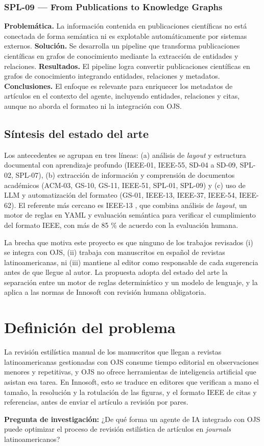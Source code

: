 \subsubsection*{SPL-09 --- From Publications to Knowledge Graphs \cite{ref26}}

\textbf{Problemática.} La información contenida en publicaciones científicas no está conectada de forma semántica ni es explotable automáticamente por sistemas externos. \textbf{Solución.} Se desarrolla un pipeline que transforma publicaciones científicas en grafos de conocimiento mediante la extracción de entidades y relaciones. \textbf{Resultados.} El pipeline logra convertir publicaciones científicas en grafos de conocimiento integrando entidades, relaciones y metadatos. \textbf{Conclusiones.} El enfoque es relevante para enriquecer los metadatos de artículos en el contexto del agente, incluyendo entidades, relaciones y citas, aunque no aborda el formateo ni la integración con OJS.

\subsection{Síntesis del estado del arte}

Los antecedentes se agrupan en tres líneas: (a) análisis de \emph{layout} y estructura documental con aprendizaje profundo (IEEE-01, IEEE-55, SD-04 a SD-09, SPL-02, SPL-07), (b) extracción de información y comprensión de documentos académicos (ACM-03, GS-10, GS-11, IEEE-51, SPL-01, SPL-09) y (c) uso de LLM y automatización del formateo (GS-01, IEEE-13, IEEE-37, IEEE-54, IEEE-62). El referente más cercano es IEEE-13 \cite{ref9}, que combina análisis de \emph{layout}, un motor de reglas en YAML y evaluación semántica para verificar el cumplimiento del formato IEEE, con más de 85 \% de acuerdo con la evaluación humana.

La brecha que motiva este proyecto es que ninguno de los trabajos revisados (i) se integra con OJS, (ii) trabaja con manuscritos en español de revistas latinoamericanas, ni (iii) mantiene al editor como responsable de cada sugerencia antes de que llegue al autor. La propuesta adopta del estado del arte la separación entre un motor de reglas determinístico y un modelo de lenguaje, y la aplica a las normas de Innosoft con revisión humana obligatoria.

\section{Definición del problema}

La revisión estilística manual de los manuscritos que llegan a revistas latinoamericanas gestionadas con OJS consume tiempo editorial en observaciones menores y repetitivas, y OJS no ofrece herramientas de inteligencia artificial que asistan esa tarea. En Innosoft, esto se traduce en editores que verifican a mano el tamaño, la resolución y la rotulación de las figuras, y el formato IEEE de citas y referencias, antes de enviar el artículo a revisión por pares.

\textbf{Pregunta de investigación:} ¿De qué forma un agente de IA integrado con OJS puede optimizar el proceso de revisión estilística de artículos en \emph{journals} latinoamericanos?

